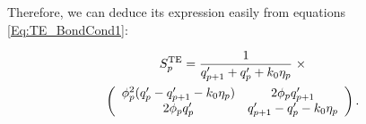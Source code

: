 \documentclass[aps,pra,superscriptaddress,amsmath,amssymb,showpacs,twocolumn,notitlepage]{revtex4-1}
\begin{document}
Therefore, we can deduce its expression easily from equations \eqref{Eq:TE_BondCond1}:

\begin{multline} 
\label{Eq:TE_BondCond_Smat2}
S_p^{\rm{TE}}=\dfrac{1}{q_{p+1}'+q_p'+k_0\eta_p} \;\times\\
\left(\begin{array}{cc} \phi_p^2(q_{p}'-q_{p+1}'-k_0\eta_p)  & 2\phi_p q_{p+1}' \\  2 \phi_p q_p'  & q_{p+1}'-q_p'-k_0\eta_p \end{array} \right).
\end{multline} 
\end{document}
